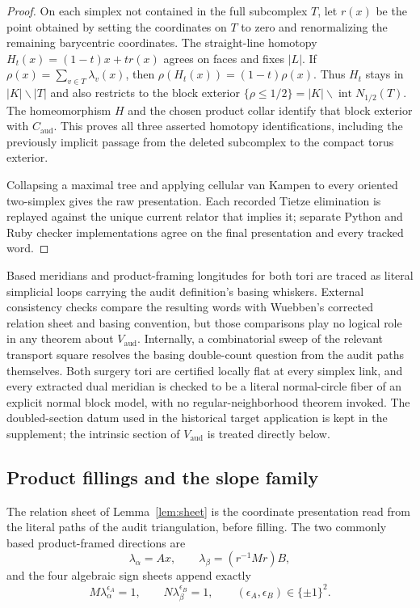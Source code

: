 \documentclass[11pt]{article}
\theoremstyle{definition}
\begin{document}
\begin{proof}
On each simplex not contained in the full subcomplex $T$, let $r(x)$ be the
point obtained by setting the coordinates on $T$ to zero and renormalizing
the remaining barycentric coordinates.  The straight-line homotopy
$H_t(x)=(1-t)x+tr(x)$ agrees on faces and fixes $|L|$.  If
$\rho(x)=\sum_{v\in T}\lambda_v(x)$, then
$\rho(H_t(x))=(1-t)\rho(x)$.  Thus $H_t$ stays in
$|K|\smallsetminus|T|$ and also restricts to the block exterior
$\{\rho\leq1/2\}=|K|\smallsetminus\operatorname{int}N_{1/2}(T)$.
The homeomorphism $H$ and the chosen product collar identify that block
exterior with $C_{\mathrm{aud}}$.  This proves all three asserted homotopy
identifications, including the previously implicit passage from the deleted
subcomplex to the compact torus exterior.

Collapsing a maximal tree and applying cellular van Kampen to every oriented
two-simplex gives the raw presentation.  Each recorded Tietze elimination is
replayed against the unique current relator that implies it; separate Python
and Ruby checker implementations agree on the final presentation and every
tracked word.
\end{proof}

Based meridians and product-framing longitudes for both tori are traced as
literal simplicial loops carrying the audit definition's basing whiskers.
External consistency checks compare the resulting words with Wuebben's
corrected relation sheet and basing convention, but those comparisons play
no logical role in any theorem about $V_{\mathrm{aud}}$.  Internally, a
combinatorial sweep of the relevant transport square resolves the basing
double-count question from the audit paths themselves.  Both surgery tori are certified locally
flat at every simplex link, and every extracted dual meridian is checked
to be a literal normal-circle fiber of an explicit normal block model,
with no regular-neighborhood theorem invoked.  The doubled-section datum
used in the historical target application is kept in the supplement; the
intrinsic section of $V_{\mathrm{aud}}$ is treated directly below.

\subsection{Product fillings and the slope family}

The relation sheet of Lemma~\ref{lem:sheet} is the coordinate presentation
read from the literal paths of the audit triangulation, before filling.
The two commonly based product-framed directions are
\[
 \lambda_\alpha=Ax,\qquad
 \lambda_\beta=(r^{-1}Mr)B,
\]
and the four algebraic sign sheets append exactly
\begin{equation}\label{eq:fillings}
 M\lambda_\alpha^{\epsilon_A}=1,\qquad
 N\lambda_\beta^{\epsilon_B}=1,\qquad
 (\epsilon_A,\epsilon_B)\in\{\pm1\}^2.
\end{equation}
\end{document}
